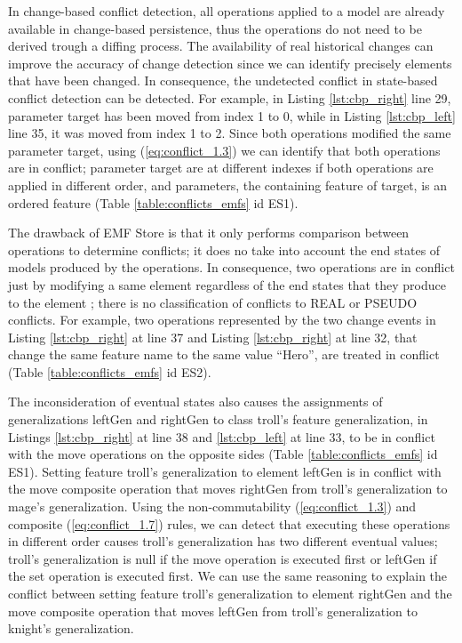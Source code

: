 In change-based conflict detection, all operations applied to a model are already available in change-based persistence, thus the operations do not need to be derived trough a diffing process. The availability of real historical changes can improve the accuracy of change detection since we can identify precisely elements that have been changed. In consequence, the undetected conflict in state-based conflict detection can be detected. For example, in Listing \ref{lst:cbp_right} line 29, parameter \textsf{target} has been moved from index 1 to 0, while in Listing \ref{lst:cbp_left} line 35, it was moved from index 1 to 2. Since both operations modified the same parameter \textsf{target}, using (\ref{eq:conflict_1.3}) we can identify that both operations are in conflict; parameter \textsf{target} are at different indexes if both operations are applied in different order, and \textsf{parameters}, the containing feature of \textsf{target}, is an ordered feature (Table \ref{table:conflicts_emfs} id ES1).  

The drawback of EMF Store is that it only performs comparison between operations to determine conflicts; it does no take into account the end states of models produced by the operations. In consequence, two operations are in conflict just by modifying a same element regardless of the end states that they produce to the element \cite{DBLP:conf/sfm/BroschKLSWW12}; there is no classification of conflicts to \textsf{REAL} or \textsf{PSEUDO} conflicts. For example, two operations represented by the two change events in Listing \ref{lst:cbp_right} at line 37 and Listing \ref{lst:cbp_right} at line 32, that change the same feature \textsf{name} to the same value ``Hero'', are treated in conflict (Table \ref{table:conflicts_emfs} id ES2). 

The inconsideration of eventual states also causes the assignments of generalizations \textsf{leftGen} and \textsf{rightGen} to class \textsf{troll}'s feature \textsf{generalization}, in Listings \ref{lst:cbp_right} at line 38 and \ref{lst:cbp_left} at line 33, to be in conflict with the \textsf{move} operations on the opposite sides (Table \ref{table:conflicts_emfs} id ES1). Setting feature \textsf{troll}'s \textsf{generalization} to element \textsf{leftGen} is in conflict with the \textsf{move} composite operation that moves \textsf{rightGen} from \textsf{troll}'s \textsf{generalization} to \textsf{mage}'s \textsf{generalization}. Using the non-commutability (\ref{eq:conflict_1.3}) and composite (\ref{eq:conflict_1.7}) rules, we can detect that executing these operations in different order causes \textsf{troll}'s \textsf{generalization} has two different eventual values; \textsf{troll}'s \textsf{generalization} is null if the \textsf{move} operation is executed first or \textsf{leftGen} if the \textsf{set} operation is executed first. We can use the same reasoning to explain the conflict between setting feature \textsf{troll}'s \textsf{generalization} to element \textsf{rightGen} and the \textsf{move} composite operation that moves \textsf{leftGen} from \textsf{troll}'s \textsf{generalization} to \textsf{knight}'s \textsf{generalization}.

